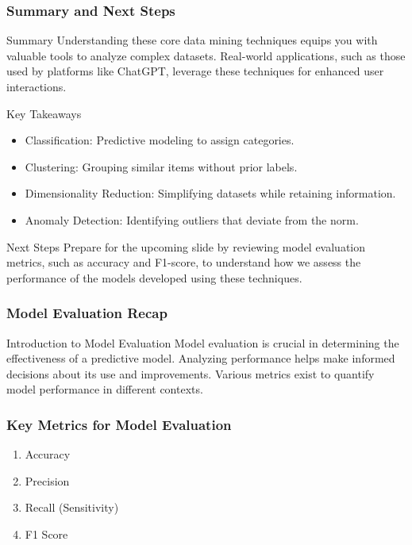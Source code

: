 \documentclass[aspectratio=169]{beamer}
\begin{document}
\begin{frame}[fragile]
  \frametitle{Summary and Next Steps}
  \begin{block}{Summary}
    Understanding these core data mining techniques equips you with valuable tools to analyze complex datasets. Real-world applications, such as those used by platforms like ChatGPT, leverage these techniques for enhanced user interactions.
  \end{block}

  \begin{block}{Key Takeaways}
    \begin{itemize}
      \item Classification: Predictive modeling to assign categories.
      \item Clustering: Grouping similar items without prior labels.
      \item Dimensionality Reduction: Simplifying datasets while retaining information.
      \item Anomaly Detection: Identifying outliers that deviate from the norm.
    \end{itemize}
  \end{block}

  \begin{block}{Next Steps}
    Prepare for the upcoming slide by reviewing model evaluation metrics, such as accuracy and F1-score, to understand how we assess the performance of the models developed using these techniques.
  \end{block}
\end{frame}

\begin{frame}[fragile]
    \frametitle{Model Evaluation Recap}
    \begin{block}{Introduction to Model Evaluation}
        Model evaluation is crucial in determining the effectiveness of a predictive model. Analyzing performance helps make informed decisions about its use and improvements. Various metrics exist to quantify model performance in different contexts.
    \end{block}
\end{frame}

\begin{frame}[fragile]
    \frametitle{Key Metrics for Model Evaluation}
    \begin{enumerate}
        \item Accuracy
        \item Precision
        \item Recall (Sensitivity)
        \item F1 Score
    \end{enumerate}
\end{frame}
\end{document}
